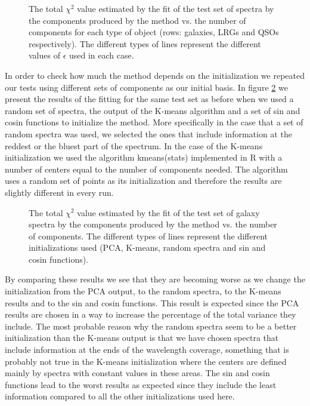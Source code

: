 \documentclass[apj]{emulateapj}
\begin{document}
\begin{figure}[h]
\caption{The total $\chi^2$ value estimated by the fit of the test set of spectra by the components produced by the method vs. the number of components for each type of object (rows: galaxies, LRGs and QSOs respectively). The different types of lines represent the different values of $\epsilon$ used in each case.}
\label{f3}
\end{figure}

In order to check how much the method depends on the initialization we repeated our tests using different sets of components as our initial basis. In figure \ref{f4} we present the results of the fitting for the same test set as before when we used a random set of spectra, the output of the K-means algorithm and a set of sin and cosin functions to initialize the method. More specifically in the case that a set of random spectra was used, we selected the ones that include information at the reddest or the bluest part of the spectrum. In the case of the K-means initialization we used the algorithm kmeans(stats) implemented in R with a number of centers equal to the number of components needed. The algorithm uses a random set of points as its initialization and therefore the results are slightly different in every run.

\begin{figure}[h]
\caption{The total $\chi^2$ value estimated by the fit of the test set of galaxy spectra by the components produced by the method vs. the number of components. The different types of lines represent the different initializations used (PCA, K-means, random spectra and sin and cosin functions).}
\label{f4}
\end{figure}

By comparing these results we see that they are becoming worse as we change the initialization from the PCA output, to the random spectra, to the K-means results and to the sin and cosin functions. This result is expected since the PCA results are chosen in a way to increase the percentage of the total variance they include. The most probable reason why the random spectra seem to be a better initialization than the K-means output is that we have chosen spectra that include information at the ends of the wavelength coverage, something that is probably not true in the K-means initialization where the centers are defined mainly by spectra with constant values in these areas. The sin and cosin functions lead to the worst results as expected since they include the least information compared to all the other initializations used here.
\end{document}
